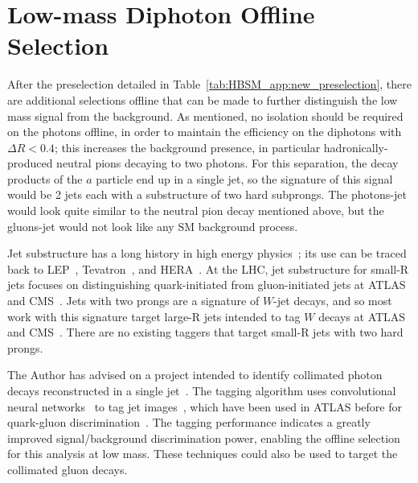 \section{Low-mass Diphoton Offline Selection}
\label{sec:HBSM_app:lowmass_offline}
After the preselection detailed in Table~\ref{tab:HBSM_app:new_preselection}, there are additional selections offline that can be made to further distinguish the low mass signal from the background.
As mentioned, no isolation should be required on the photons offline, in order to maintain the efficiency on the diphotons with $\Delta R<0.4$; this increases the background presence, in particular hadronically-produced neutral pions decaying to two photons.
For this separation, the decay products of the $a$ particle end up in a single jet, so the signature of this signal would be 2 jets each with a substructure of two hard subprongs.
The photons-jet would look quite similar to the neutral pion decay mentioned above, but the gluons-jet would not look like any SM background process.

Jet substructure has a long history in high energy physics~\cite{Larkoski:2017jix,Asquith:2018igt};
its use can be traced back to LEP~\cite{Alexander:1991ce,Barate:1998cp,Abreu:1995hp,Acciarri:1997it}, Tevatron~\cite{Abe:1992wv,Abachi:1995zw}, and HERA~\cite{Breitweg:1997gg,Breitweg:1998gf,Adloff:1998ni}.
At the LHC, jet substructure for small-R jets focuses on distinguishing quark-initiated from gluon-initiated jets at ATLAS~\cite{ATL-PHYS-PUB-2017-009,Aad:2014gea,ATLAS-CONF-2016-034,ATL-PHYS-PUB-2017-017} and CMS~\cite{CMS-PAS-JME-16-003,CMS-PAS-JME-13-002,CMS-DP-2016-070,CMS-DP-2017-027}.
Jets with two prongs are a signature of $W$-jet decays, and so most work with this signature target large-R jets intended to tag $W$ decays at ATLAS~\cite{Aad:2015rpa,Aaboud:2018psm} and CMS~\cite{Khachatryan:2014vla}.
There are no existing taggers that target small-R jets with two hard prongs.

The Author has advised on a project intended to identify collimated photon decays reconstructed in a single jet~\cite{mergedphotonid}.
The tagging algorithm uses convolutional neural networks~\cite{fukushima1980neocognitron,lecun1998gradient,schmidhuber2015deep} to tag jet images~\cite{Cogan:2014oua,deOliveira:2015xxd}, which have been used in ATLAS before for quark-gluon discrimination~\cite{ATL-PHYS-PUB-2017-017}.
The tagging performance indicates a greatly improved signal/background discrimination power, enabling the offline selection for this analysis at low mass.
These techniques could also be used to target the collimated gluon decays.

